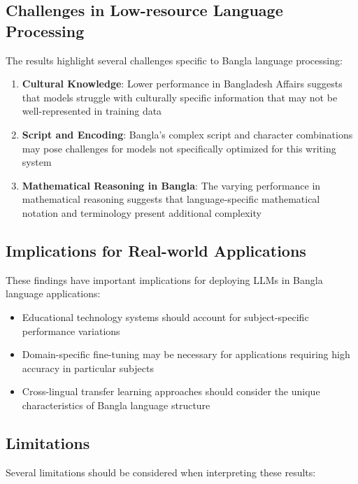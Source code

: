 \documentclass[11pt,a4paper]{article}
\begin{document}
\subsection{Challenges in Low-resource Language Processing}

The results highlight several challenges specific to Bangla language processing:

\begin{enumerate}
    \item \textbf{Cultural Knowledge}: Lower performance in Bangladesh Affairs suggests that models struggle with culturally specific information that may not be well-represented in training data
    
    \item \textbf{Script and Encoding}: Bangla's complex script and character combinations may pose challenges for models not specifically optimized for this writing system
    
    \item \textbf{Mathematical Reasoning in Bangla}: The varying performance in mathematical reasoning suggests that language-specific mathematical notation and terminology present additional complexity
\end{enumerate}

\subsection{Implications for Real-world Applications}

These findings have important implications for deploying LLMs in Bangla language applications:

\begin{itemize}
    \item Educational technology systems should account for subject-specific performance variations
    \item Domain-specific fine-tuning may be necessary for applications requiring high accuracy in particular subjects
    \item Cross-lingual transfer learning approaches should consider the unique characteristics of Bangla language structure
\end{itemize}

\subsection{Limitations}

Several limitations should be considered when interpreting these results:
\end{document}
